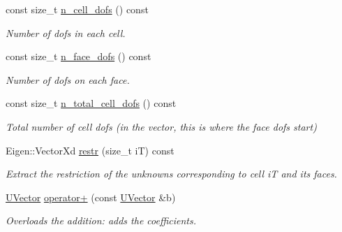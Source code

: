 \begin{DoxyCompactItemize}
\mbox{\label{classHArDCore3D_1_1UVector_a0ca65e887f268ac464d45c45f2d1c4a4}} 
const size\+\_\+t \hyperlink{classHArDCore3D_1_1UVector_a0ca65e887f268ac464d45c45f2d1c4a4}{n\+\_\+cell\+\_\+dofs} () const
\begin{DoxyCompactList}\small\item\em Number of dofs in each cell. \end{DoxyCompactList}\item 
\mbox{\label{classHArDCore3D_1_1UVector_aa1f68faa5324ceceee6d49e66e766fc3}} 
const size\+\_\+t \hyperlink{classHArDCore3D_1_1UVector_aa1f68faa5324ceceee6d49e66e766fc3}{n\+\_\+face\+\_\+dofs} () const
\begin{DoxyCompactList}\small\item\em Number of dofs on each face. \end{DoxyCompactList}\item 
\mbox{\label{classHArDCore3D_1_1UVector_a5a48f281a6cdabd298d5f2edf4c04022}} 
const size\+\_\+t \hyperlink{classHArDCore3D_1_1UVector_a5a48f281a6cdabd298d5f2edf4c04022}{n\+\_\+total\+\_\+cell\+\_\+dofs} () const
\begin{DoxyCompactList}\small\item\em Total number of cell dofs (in the vector, this is where the face dofs start) \end{DoxyCompactList}\item 
\mbox{\label{classHArDCore3D_1_1UVector_a24a0a68f8f1e8bdc4845bee48b7ce8d2}} 
Eigen\+::\+Vector\+Xd \hyperlink{classHArDCore3D_1_1UVector_a24a0a68f8f1e8bdc4845bee48b7ce8d2}{restr} (size\+\_\+t iT) const
\begin{DoxyCompactList}\small\item\em Extract the restriction of the unknowns corresponding to cell iT and its faces. \end{DoxyCompactList}\item 
\mbox{\label{classHArDCore3D_1_1UVector_a7b9eb68a1bd6c64cedffe79bd7c9dc1b}} 
\hyperlink{classHArDCore3D_1_1UVector}{U\+Vector} \hyperlink{classHArDCore3D_1_1UVector_a7b9eb68a1bd6c64cedffe79bd7c9dc1b}{operator+} (const \hyperlink{classHArDCore3D_1_1UVector}{U\+Vector} \&b)
\begin{DoxyCompactList}\small\item\em Overloads the addition\+: adds the coefficients. \end{DoxyCompactList}\item 

\end{DoxyCompactItemize}
